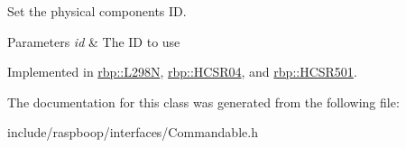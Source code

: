 Set the physical component\textquotesingle{}s I\+D. 


\begin{DoxyParams}{Parameters}
{\em id} & The I\+D to use \\
\hline
\end{DoxyParams}


Implemented in \hyperlink{classrbp_1_1L298N_ae2557785a6795a727c6526baade4c174}{rbp\+::\+L298\+N}, \hyperlink{classrbp_1_1HCSR04_a32db67ffcb0adac730ed32523ceec111}{rbp\+::\+H\+C\+S\+R04}, and \hyperlink{classrbp_1_1HCSR501_a12e4d4dbdfce36157af3042fe65cbb50}{rbp\+::\+H\+C\+S\+R501}.



The documentation for this class was generated from the following file\+:\begin{DoxyCompactItemize}
\item 
include/raspboop/interfaces/Commandable.\+h\end{DoxyCompactItemize}
